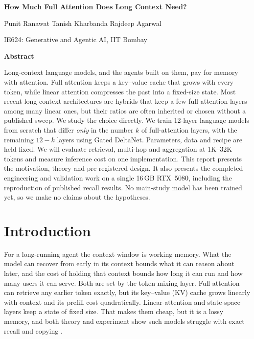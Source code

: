 \documentclass[10pt,a4paper]{article}
\begin{document}
\setcounter{page}{1}
\begin{center}
{\fontsize{15}{19}\selectfont\bfseries How Much Full Attention Does Long Context Need?\par}
\vspace{0.25cm}
{Punit Ranawat \quad Tanish Kharbanda \quad Rajdeep Agarwal\par}
{\small IE624: Generative and Agentic AI, IIT Bombay\par}
\end{center}
\vspace{0.1cm}
\begin{center}{\large\bfseries Abstract}\end{center}
\vspace{-0.25cm}
\begin{list}{}{\setlength{\leftmargin}{0.5in}\setlength{\rightmargin}{0.5in}}\item[]
Long-context language models, and the agents built on them, pay for memory with attention. Full
attention keeps a key--value cache that grows with every token, while linear attention compresses the
past into a fixed-size state. Most recent long-context architectures are hybrids that keep a few full
attention layers among many linear ones, but their ratios are often inherited or chosen without a published sweep.
We study the choice directly. We train 12-layer language models from scratch that differ \emph{only} in the number $k$ of
full-attention layers, with the remaining $12-k$ layers using Gated DeltaNet. Parameters, data and recipe are held fixed. We will evaluate
retrieval, multi-hop and aggregation at 1K--32K tokens and measure inference cost on one implementation.
This report presents the motivation, theory and pre-registered design. It also presents the completed
engineering and validation work on a single 16\,GB RTX~5080, including the reproduction of published
recall results. No main-study model has been trained yet, so we make no claims about the hypotheses.
\end{list}

\section{Introduction}
For a long-running agent the context window is working memory. What the model can recover from early
in its context bounds what it can reason about later, and the cost of holding that context bounds how
long it can run and how many users it can serve. Both are set by the token-mixing layer. Full attention
\citep{vaswani2017attention} can retrieve any earlier token exactly, but its key--value (KV) cache grows
linearly with context and its prefill cost quadratically. Linear-attention and state-space layers
\citep{katharopoulos2020transformers,dao2024transformers,yang2025gated} keep a state of fixed size. That
makes them cheap, but it is a lossy memory, and both theory and experiment show such models struggle with exact
recall and copying \citep{arora2023zoology,jelassi2024repeat,wen2024rnns}.
\end{document}
